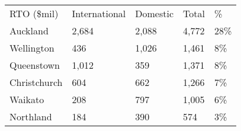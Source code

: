 \begin{tabular}[t]{p{2cm}>{\hfill}p{1.5cm}>{\hfill}p{1cm}>{\hfill}p{0.9cm}>{\hfill}p{1.3cm}}
 RTO (\$mil) & International & Domestic & Total & \% \\ 
 Auckland & 2,684 & 2,088 & 4,772 & 28\% \\ 
  Wellington &   436 & 1,026 & 1,461 & 8\% \\ 
  Queenstown & 1,012 &   359 & 1,371 & 8\% \\ 
  Christchurch &   604 &   662 & 1,266 & 7\% \\ 
  Waikato &   208 &   797 & 1,005 & 6\% \\ 
  Northland &   184 &   390 &   574 & 3\% \\ 
  \end{tabular}
